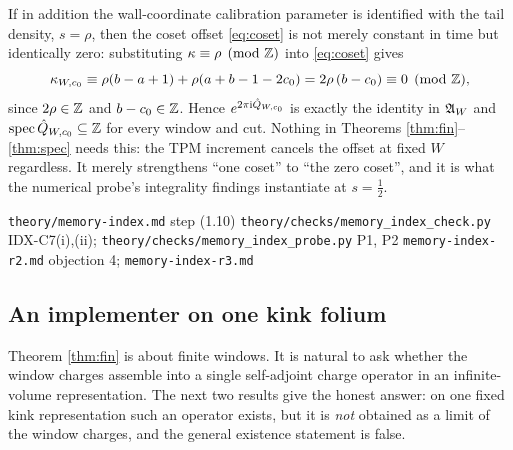 \begin{remark}
\label{ref:zero-offset}
If in addition the wall-coordinate calibration parameter is identified with
the tail density, $s=\rho$, then the coset offset \eqref{eq:coset} is not
merely constant in time but identically zero: substituting
$\kappa\equiv\rho \pmod{\mathbb{Z}}$ into \eqref{eq:coset} gives
\begin{equation}
  \kappa_{W,c_0}\equiv \rho(b-a+1)+\rho(a+b-1-2c_0)=2\rho\,(b-c_0)\equiv 0
  \pmod{\mathbb{Z}},
  \label{eq:zero-offset}
\end{equation}
since $2\rho\in\mathbb{Z}$ and $b-c_0\in\mathbb{Z}$. Hence $e^{2\pi\mathrm{i}\hat{Q}_{W,c_0}}$
is exactly the identity in $\mathfrak{A}_W$ and $\operatorname{spec}\hat{Q}_{W,c_0}\subseteq\mathbb{Z}$ for
every window and cut. Nothing in Theorems \ref{thm:fin}--\ref{thm:spec} needs
this: the TPM increment cancels the offset at fixed $W$ regardless. It merely
strengthens ``one coset'' to ``the zero coset'', and it is what the numerical
probe's integrality findings instantiate at $s=\tfrac12$.
\end{remark}

{\texttt{theory/memory-index.md} step (1.10)}
{\texttt{theory/checks/memory\_index\_check.py} IDX-C7(i),(ii);\linebreak
 \texttt{theory/checks/memory\_index\_probe.py} P1, P2}
{\texttt{memory-index-r2.md} objection 4; \texttt{memory-index-r3.md}}

\subsection{An implementer on one kink folium}

Theorem \ref{thm:fin} is about finite windows. It is natural to ask whether
the window charges assemble into a single self-adjoint charge operator in an
infinite-volume representation. The next two results give the honest answer:
on one fixed kink representation such an operator exists, but it is
\emph{not} obtained as a limit of the window charges, and the general
existence statement is false.

